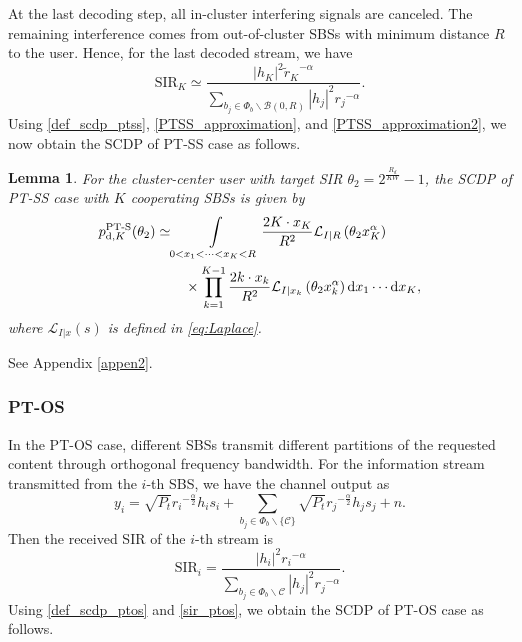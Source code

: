 \documentclass[twocolumns,10pt]{IEEEtran}
\newtheorem{lemma}{Lemma}
\begin{document}
At the last decoding step, all in-cluster interfering signals are canceled. The remaining interference comes from out-of-cluster SBSs with minimum distance $R$ to the user. Hence, for the last decoded stream, we have 
\begin{equation}
\text{SIR}_{K}\simeq \frac{\left|h_K\right|^2 {\widetilde{r}_K}^{-\alpha}}{\sum\limits_{b_j\in \Phi_b \backslash \mathcal{B}(0, R)} |h_j|^2 {r_j}^{-\alpha}}.
\label{PTSS_approximation2}
\end{equation} 
Using \eqref{def_scdp_ptss}, \eqref{PTSS_approximation}, and \eqref{PTSS_approximation2}, we now obtain the SCDP of PT-SS case as follows.

\begin{lemma}
	\label{lemma2}
	For the cluster-center user with target SIR $\theta_2=2^{\frac{R_d}{KW}}-1$,
	the SCDP of PT-SS case with $K$ cooperating SBSs is given by
	\begin{align}
	\begin{split}
	p_{\textnormal{d},K}^{\textnormal{PT-S}}(\theta_2)
	\simeq  
	& \int\limits_{0<x_1<\cdots<x_K<R} 
	\frac{2 K\cdot x_K}{R^2} \mathcal{L}_{I|R}\left(\theta_2 x_K^\alpha\right)\\ 
	& \quad\times \prod\limits_{k=1}^{K-1} \frac{2 k\cdot x_k}{R^2} \mathcal{L}_{I|x_k}\left(\theta_2 x_k^\alpha\right)
	\textnormal{d}x_1 \cdots \textnormal{d}x_K ,
	\end{split}
	\label{Psuc_PT_expression}
	\end{align}
	where $\mathcal{L}_{I|x}(s)$ is defined in \eqref{eq:Laplace}. 
\end{lemma}
\begin{IEEEproof}
	\textnormal{See Appendix \ref{appen2}.}
\end{IEEEproof}


\subsubsection{PT-OS}
In the PT-OS case, different SBSs transmit different partitions of the requested content through orthogonal frequency bandwidth. For the information stream transmitted from the $i$-th SBS, we have the channel output as
\begin{equation}
y_{i}=\sqrt{P_t} {r_i}^{-\frac{\alpha}{2}} h_{i} s_{i} +\sum_{b_j\in \Phi_b \backslash \{\mathcal{C}\} } \sqrt{P_t} {r_j}^{-\frac{\alpha}{2}} h_j s_j+n.
\end{equation} 
Then the received SIR of the $i$-th stream is 
\begin{equation}
	\text{SIR}_{i}=\frac{\left|h_i\right|^2 {r_i}^{-\alpha}}{\sum\limits_{b_j\in \Phi_b \backslash \mathcal{C}} |h_j|^2 {r_j}^{-\alpha}}.
	\label{sir_ptos}
\end{equation} 
Using \eqref{def_scdp_ptos} and \eqref{sir_ptos}, we obtain the SCDP of PT-OS case as follows.
\end{document}

